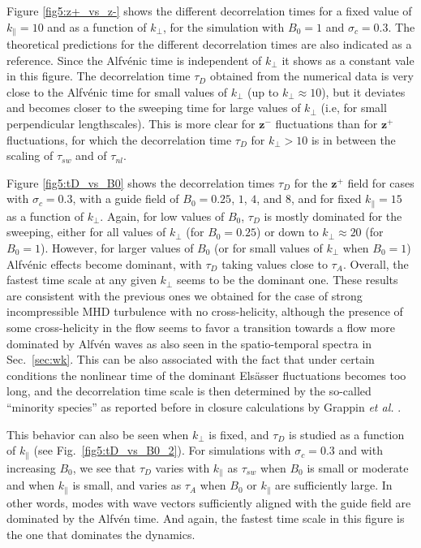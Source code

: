\documentclass[aip,pop,reprint,amsmath,amssymb,floatfix]{revtex4-1}
\renewcommand{\vec}[1]{\mathbf{#1}}
\begin{document}
Figure \ref{fig5:z+_vs_z-} shows the different decorrelation times for
a fixed value of $k_{\parallel}=10$ and as a function of $k_{\perp}$,
for the simulation with $B_0=1$ and $\sigma_c=0.3$. The theoretical
predictions for the different decorrelation times are also indicated
as a reference. Since the Alfv\'enic time is independent of
$k_{\perp}$ it shows as a constant vale in this figure. The
decorrelation time $\tau_D$ obtained from the numerical data is very
close to the Alfv\'enic time for small values of $k_{\perp}$ (up to
$k_\perp \approx 10$), but it deviates and becomes closer to the
sweeping time for large values of $k_{\perp}$ (i.e, for small
perpendicular lengthscales). This is more clear for $\vec{z}^-$
fluctuations than for $\vec{z}^+$ fluctuations, for which the
decorrelation time $\tau_D$ for $k_\perp > 10$ is in between the
scaling of $\tau_{sw}$ and of $\tau_{nl}$.

Figure \ref{fig5:tD_vs_B0} shows the decorrelation times $\tau_D$ for
the $\vec{z}^+$ field for cases with $\sigma_c = 0.3$, with a guide
field of $B_0=0.25$, $1$, $4$, and $8$, and for fixed $k_\parallel =
15$ as a function of $k_\perp$. Again, for low values of $B_0$,
$\tau_D$ is mostly dominated for the sweeping, either for all values
of $k_\perp$ (for $B_0=0.25$) or down to $k_\perp \approx 20$ (for
$B_0=1$). However, for larger values of $B_0$ (or for small values of
$k_\perp$ when $B_0=1$) Alfv\'enic effects become dominant, with
$\tau_D$ taking values close to $\tau_{A}$. Overall, the fastest time
scale at any given $k_\perp$ seems to be the dominant one. These
results are consistent with the previous ones we obtained
\cite{lugones_2016_spatiotemporal} for the case of strong
incompressible MHD turbulence with no cross-helicity, although the
presence of some cross-helicity in the flow seems to favor a
transition towards a flow more dominated by Alfv\'en waves as also
seen in the spatio-temporal spectra in Sec.~\ref{sec:wk}. This can be
also associated with the fact that under certain conditions the
nonlinear time of the dominant Els\"asser fluctuations becomes too
long, and the decorrelation time scale is then determined by the
so-called ``minority species'' as reported before in closure
calculations by Grappin \textit{et al.}
\cite{grappin_1983_dependence}.

This behavior can also be seen when $k_\perp$ is fixed, and $\tau_D$
is studied as a function of $k_\parallel$ (see
Fig.~\ref{fig5:tD_vs_B0_2}). For simulations with $\sigma_c=0.3$ and
with increasing $B_0$, we see that $\tau_D$ varies with $k_\parallel$
as $\tau_{sw}$ when $B_0$ is small or moderate and when $k_\parallel$
is small, and varies as $\tau_A$ when $B_0$ or $k_\parallel$ are
sufficiently large. In other words, modes with wave vectors
sufficiently aligned with the guide field are dominated by the
Alfv\'en time. And again, the fastest time scale in this figure is the
one that dominates the dynamics.
\end{document}
